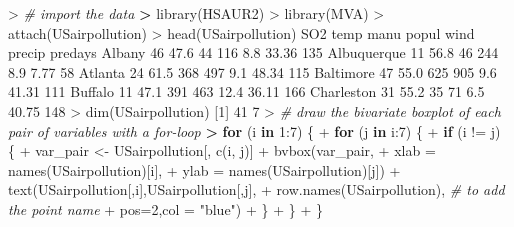 \documentclass[
]{article}
\newenvironment{Shaded}{\begin{snugshade}}{\end{snugshade}}
\newcommand{\AttributeTok}[1]{\textcolor[rgb]{0.77,0.63,0.00}{#1}}
\newcommand{\CommentTok}[1]{\textcolor[rgb]{0.56,0.35,0.01}{\textit{#1}}}
\newcommand{\ControlFlowTok}[1]{\textcolor[rgb]{0.13,0.29,0.53}{\textbf{#1}}}
\newcommand{\DecValTok}[1]{\textcolor[rgb]{0.00,0.00,0.81}{#1}}
\newcommand{\ErrorTok}[1]{\textcolor[rgb]{0.64,0.00,0.00}{\textbf{#1}}}
\newcommand{\FloatTok}[1]{\textcolor[rgb]{0.00,0.00,0.81}{#1}}
\newcommand{\FunctionTok}[1]{\textcolor[rgb]{0.00,0.00,0.00}{#1}}
\newcommand{\NormalTok}[1]{#1}
\newcommand{\OtherTok}[1]{\textcolor[rgb]{0.56,0.35,0.01}{#1}}
\newcommand{\SpecialCharTok}[1]{\textcolor[rgb]{0.00,0.00,0.00}{#1}}
\newcommand{\StringTok}[1]{\textcolor[rgb]{0.31,0.60,0.02}{#1}}
\begin{document}
\begin{Shaded}
\begin{Highlighting}[]
\SpecialCharTok{\textgreater{}} \CommentTok{\# import the data}
\ErrorTok{\textgreater{}} \FunctionTok{library}\NormalTok{(HSAUR2)}
\SpecialCharTok{\textgreater{}} \FunctionTok{library}\NormalTok{(MVA)}
\SpecialCharTok{\textgreater{}} \FunctionTok{attach}\NormalTok{(USairpollution)}
\SpecialCharTok{\textgreater{}} \FunctionTok{head}\NormalTok{(USairpollution)}
\NormalTok{            SO2 temp manu popul wind precip predays}
\NormalTok{Albany       }\DecValTok{46} \FloatTok{47.6}   \DecValTok{44}   \DecValTok{116}  \FloatTok{8.8}  \FloatTok{33.36}     \DecValTok{135}
\NormalTok{Albuquerque  }\DecValTok{11} \FloatTok{56.8}   \DecValTok{46}   \DecValTok{244}  \FloatTok{8.9}   \FloatTok{7.77}      \DecValTok{58}
\NormalTok{Atlanta      }\DecValTok{24} \FloatTok{61.5}  \DecValTok{368}   \DecValTok{497}  \FloatTok{9.1}  \FloatTok{48.34}     \DecValTok{115}
\NormalTok{Baltimore    }\DecValTok{47} \FloatTok{55.0}  \DecValTok{625}   \DecValTok{905}  \FloatTok{9.6}  \FloatTok{41.31}     \DecValTok{111}
\NormalTok{Buffalo      }\DecValTok{11} \FloatTok{47.1}  \DecValTok{391}   \DecValTok{463} \FloatTok{12.4}  \FloatTok{36.11}     \DecValTok{166}
\NormalTok{Charleston   }\DecValTok{31} \FloatTok{55.2}   \DecValTok{35}    \DecValTok{71}  \FloatTok{6.5}  \FloatTok{40.75}     \DecValTok{148}
\SpecialCharTok{\textgreater{}} \FunctionTok{dim}\NormalTok{(USairpollution)}
\NormalTok{[}\DecValTok{1}\NormalTok{] }\DecValTok{41}  \DecValTok{7}
\SpecialCharTok{\textgreater{}} \CommentTok{\# draw the bivariate boxplot of each pair of variables with a for{-}loop}
\ErrorTok{\textgreater{}} \ControlFlowTok{for}\NormalTok{ (i }\ControlFlowTok{in} \DecValTok{1}\SpecialCharTok{:}\DecValTok{7}\NormalTok{) \{}
\SpecialCharTok{+}   \ControlFlowTok{for}\NormalTok{ (j }\ControlFlowTok{in}\NormalTok{ i}\SpecialCharTok{:}\DecValTok{7}\NormalTok{) \{}
\SpecialCharTok{+}     \ControlFlowTok{if}\NormalTok{ (i }\SpecialCharTok{!=}\NormalTok{ j) \{}
\SpecialCharTok{+}\NormalTok{       var\_pair }\OtherTok{\textless{}{-}}\NormalTok{ USairpollution[, }\FunctionTok{c}\NormalTok{(i, j)]}
\SpecialCharTok{+}       \FunctionTok{bvbox}\NormalTok{(var\_pair, }
\SpecialCharTok{+}             \AttributeTok{xlab =} \FunctionTok{names}\NormalTok{(USairpollution)[i],}
\SpecialCharTok{+}             \AttributeTok{ylab =} \FunctionTok{names}\NormalTok{(USairpollution)[j])}
\SpecialCharTok{+}       \FunctionTok{text}\NormalTok{(USairpollution[,i],USairpollution[,j],}
\SpecialCharTok{+}           \FunctionTok{row.names}\NormalTok{(USairpollution), }\CommentTok{\# to add the point name}
\SpecialCharTok{+}           \AttributeTok{pos=}\DecValTok{2}\NormalTok{,}\AttributeTok{col =} \StringTok{"blue"}\NormalTok{)}
\SpecialCharTok{+}\NormalTok{     \} }
\SpecialCharTok{+}\NormalTok{   \}}
\SpecialCharTok{+}\NormalTok{ \}}
\end{Highlighting}
\end{Shaded}
\end{document}
